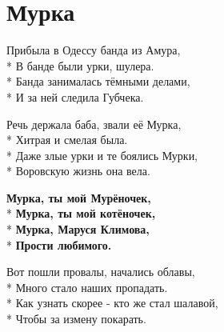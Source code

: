 \vspace{\fill}\newpage

\section{Мурка}
\label{song:Мурка}

\medskip

\begin{minipage}{\linewidth}
Прибыла в Одессу банда из Амура,\\*
В банде были урки, шулера.\\*
Банда занималась тёмными делами,\\*
И за ней следила Губчека.\\
\end{minipage}\par\medskip\nobreak

\medskip

\begin{minipage}{\linewidth}
Речь держала баба, звали её Мурка,\\*
Хитрая и смелая была.\\*
Даже злые урки и те боялись Мурки,\\*
Воровскую жизнь она вела.\\
\end{minipage}\par\medskip\nobreak

\medskip

\begin{minipage}{\linewidth}
\hspace*{1.5em}\textbf{Мурка, ты мой Мурёночек,}\\*
\hspace*{1.5em}\textbf{Мурка, ты мой котёночек, }\\*
\hspace*{1.5em}\textbf{Мурка, Маруся Климова,}\\*
\hspace*{1.5em}\textbf{Прости любимого.}\\
\end{minipage}\par\medskip\nobreak

\medskip

\begin{minipage}{\linewidth}
Вот пошли провалы, начались облавы,\\*
Много стало наших пропадать.\\*
Как узнать скорее -  кто же стал шалавой,\\*
Чтобы за измену покарать.\\
\end{minipage}\par\medskip\nobreak

